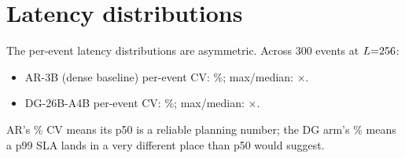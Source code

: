 \section{Latency distributions}
\label{app:distributions}

The per-event latency distributions are asymmetric. Across 300 events at
$L{=}256$:
\begin{itemize}[nosep]
\item AR-3B (dense baseline) per-event CV: \arEventCV\%; max/median: \arMaxMed$\times$.
\item DG-26B-A4B per-event CV: \dgEventCV\%; max/median: \dgMaxMed$\times$.
\end{itemize}
AR's \arEventCV\% CV means its p50 is a reliable planning number;
the DG arm's \dgEventCV\% means a p99 SLA lands in a very different
place than p50 would suggest.
